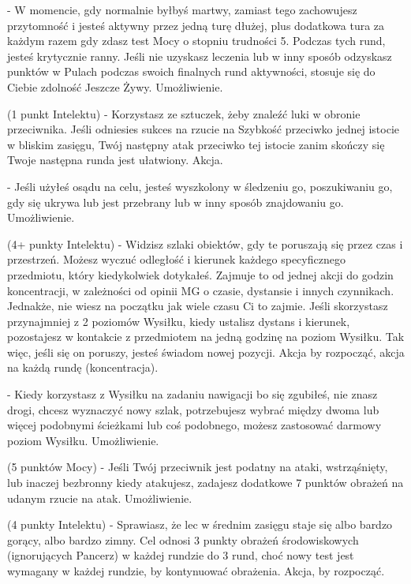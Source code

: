 { - W momencie, gdy normalnie byłbyś martwy, zamiast tego zachowujesz przytomność i jesteś aktywny przez jedną turę dłużej, plus dodatkowa tura za każdym razem gdy zdasz test Mocy o stopniu trudności 5. Podczas tych rund, jesteś krytycznie ranny. Jeśli nie uzyskasz leczenia lub w inny sposób odzyskasz punktów w Pulach podczas swoich finalnych rund aktywności, stosuje się do Ciebie zdolność Jeszcze Żywy. Umożliwienie.

 (1 punkt Intelektu) - Korzystasz ze sztuczek, żeby znaleźć luki w obronie przeciwnika. Jeśli odniesies sukces na rzucie na Szybkość przeciwko jednej istocie w bliskim zasięgu, Twój następny atak przeciwko tej istocie zanim skończy się Twoje następna runda jest ułatwiony. Akcja.

 - Jeśli użyłeś osądu na celu, jesteś wyszkolony w śledzeniu go, poszukiwaniu go, gdy się ukrywa lub jest przebrany lub w inny sposób znajdowaniu go. Umożliwienie.

 (4+ punkty Intelektu) - Widzisz szlaki obiektów, gdy te poruszają się przez czas i przestrzeń. Możesz wyczuć odległość i kierunek każdego specyficznego przedmiotu, który kiedykolwiek dotykałeś. Zajmuje to od jednej akcji do godzin koncentracji, w zależności od opinii MG o czasie, dystansie i innych czynnikach. Jednakże, nie wiesz na początku jak wiele czasu Ci to zajmie. Jeśli skorzystasz przynajmniej z 2 poziomów Wysiłku, kiedy ustalisz dystans i kierunek, pozostajesz w kontakcie z przedmiotem na jedną godzinę na poziom Wysiłku. Tak więc, jeśli się on poruszy, jesteś świadom nowej pozycji. Akcja by rozpocząć, akcja na każdą rundę (koncentracja).

 - Kiedy korzystasz z Wysiłku na zadaniu nawigacji bo się zgubiłeś, nie znasz drogi, chcesz wyznaczyć nowy szlak, potrzebujesz wybrać między dwoma lub więcej podobnymi ścieżkami lub coś podobnego, możesz zastosować darmowy poziom Wysiłku. Umożliwienie.

 (5 punktów Mocy) - Jeśli Twój przeciwnik jest podatny na ataki, wstrząśnięty, lub inaczej bezbronny kiedy atakujesz, zadajesz dodatkowe 7 punktów obrażeń na udanym rzucie na atak. Umożliwienie.

 (4 punkty Intelektu) - Sprawiasz, że lec w średnim zasięgu staje się albo bardzo gorący, albo bardzo zimny. Cel odnosi 3 punkty obrażeń środowiskowych (ignorujących Pancerz) w każdej rundzie do 3 rund, choć nowy test jest wymagany w każdej rundzie, by kontynuować obrażenia. Akcja, by rozpocząć. 

}
